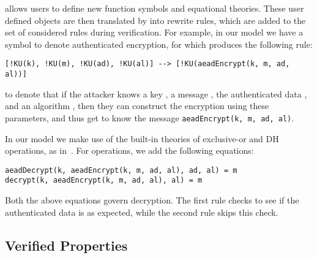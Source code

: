 \mTamarin{} allows users to define new function symbols and equational theories.
These user defined objects are then translated by \mTamarin{} into rewrite
rules, which are added to the set of considered rules during verification.
For example, in our model we have a symbol to denote authenticated encryption, for which \mTamarin{} produces the following rule:
%
\begin{lstlisting}
[!KU(k), !KU(m), !KU(ad), !KU(al)] --> [!KU(aeadEncrypt(k, m, ad, al))]
\end{lstlisting}
%
to denote that if the attacker knows a key , a message , the
authenticated data , and an algorithm , then they can construct
the encryption using these parameters, and thus get to know the message
\lstinline{aeadEncrypt(k, m, ad, al)}.

In our model we make use of
the built-in theories of exclusive-or and DH operations, as in~\cite{DBLP:conf/csfw/DreierHRS18,DBLP:conf/csfw/SchmidtMCB12}.
%
%
For \mAead{} operations, we add the following equations:
\begin{lstlisting}
aeadDecrypt(k, aeadEncrypt(k, m, ad, al), ad, al) = m
decrypt(k, aeadEncrypt(k, m, ad, al), al) = m
\end{lstlisting}
Both the above equations govern decryption. The first rule checks to see if the authenticated data is as expected, while the second rule skips this check.


 
\subsection{Verified Properties}
\label{sec:desired-properties}
 

